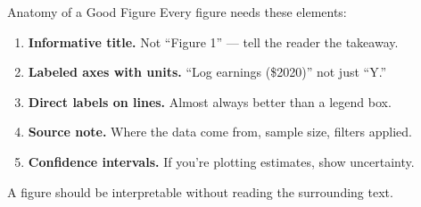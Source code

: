 \begin{frame}{Anatomy of a Good Figure}
  Every figure needs these elements:

  \vspace{4pt}

  \begin{enumerate}\setlength\itemsep{1pt}
    \item \textbf{Informative title.} Not ``Figure 1'' --- tell the reader the takeaway.

    \item \textbf{Labeled axes with units.} ``Log earnings (\$2020)'' not just ``Y.''

    \item \textbf{Direct labels on lines.} Almost always better than a legend box.

    \item \textbf{Source note.} Where the data come from, sample size, filters applied.

    \item \textbf{Confidence intervals.} If you're plotting estimates, show uncertainty.
  \end{enumerate}

  \vspace{4pt}

  A figure should be interpretable without reading the surrounding text.
\end{frame}

